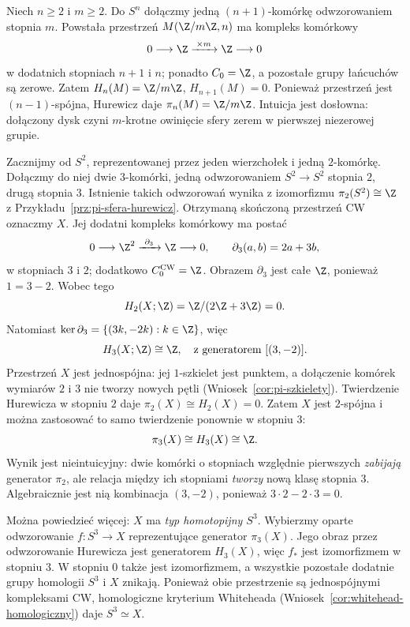 \begin{przyklad}
\label{prz:moore-hurewicz}
Niech $n\geq2$ i $m\geq2$.
Do $S^n$ dołączmy
jedną $(n+1)$-komórkę
odwzorowaniem stopnia $m$.
Powstała przestrzeń
$M(\Z/m\Z,n)$ ma
kompleks komórkowy
\[
 0\longrightarrow\Z
 \xrightarrow{\;\times m\;}\Z
 \longrightarrow0
\]
w dodatnich stopniach $n+1$ i $n$; ponadto $C_0=\Z$,
a pozostałe grupy łańcuchów są zerowe. Zatem
$H_n(M)=\Z/m\Z$,
$H_{n+1}(M)=0$.
Ponieważ przestrzeń
jest $(n-1)$-spójna,
Hurewicz daje
$\pi_n(M)=\Z/m\Z$.
Intuicja jest
dosłowna: dołączony
dysk czyni
$m$-krotne
owinięcie sfery
zerem w pierwszej
niezerowej grupie.
\end{przyklad}

\begin{przyklad}
\label{prz:pi-2-3-komorki}
Zacznijmy od $S^2$, reprezentowanej przez jeden wierzchołek
i jedną $2$-komórkę. Dołączmy do niej dwie $3$-komórki,
jedną odwzorowaniem $S^2\to S^2$ stopnia $2$,
drugą stopnia $3$. Istnienie takich odwzorowań wynika
z izomorfizmu $\pi_2(S^2)\cong\Z$
z Przykładu~\ref{prz:pi-sfera-hurewicz}.
Otrzymaną skończoną przestrzeń CW oznaczmy $X$.
Jej dodatni kompleks komórkowy ma postać
\[
 0\longrightarrow\Z^2
 \xrightarrow{\ \partial_3\ }\Z
 \longrightarrow0,\qquad
 \partial_3(a,b)=2a+3b,
\]
w stopniach $3$ i $2$; dodatkowo $C_0^{\mathrm{CW}}=\Z$.
Obrazem $\partial_3$ jest całe $\Z$,
ponieważ $1=3-2$. Wobec tego
\[
 H_2(X;\Z)=\Z/(2\Z+3\Z)=0.
\]
Natomiast
$\ker\partial_3=\{(3k,-2k):k\in\Z\}$,
więc
\[
 H_3(X;\Z)\cong\Z,
 \quad\text{z generatorem }[(3,-2)].
\]
Przestrzeń $X$ jest jednospójna: jej $1$-szkielet
jest punktem, a dołączenie komórek wymiarów $2$
i $3$ nie tworzy nowych pętli
(Wniosek~\ref{cor:pi-szkielety}).
Twierdzenie Hurewicza w stopniu $2$ daje
$\pi_2(X)\cong H_2(X)=0$.
Zatem $X$ jest $2$-spójna i można zastosować
to samo twierdzenie ponownie w stopniu $3$:
\[
 \pi_3(X)\cong H_3(X)\cong\Z.
\]
Wynik jest nieintuicyjny: dwie komórki o stopniach
względnie pierwszych \emph{zabijają} generator $\pi_2$,
ale relacja między ich stopniami \emph{tworzy}
nową klasę stopnia $3$. Algebraicznie jest nią
kombinacja $(3,-2)$, ponieważ $3\cdot2-2\cdot3=0$.

Można powiedzieć więcej: $X$ ma \emph{typ homotopijny $S^3$}.
Wybierzmy oparte odwzorowanie $f:S^3\to X$ reprezentujące
generator $\pi_3(X)$. Jego obraz przez odwzorowanie Hurewicza
jest generatorem $H_3(X)$, więc $f_*$ jest izomorfizmem
w stopniu $3$. W stopniu $0$ także jest izomorfizmem,
a wszystkie pozostałe dodatnie grupy homologii
$S^3$ i $X$ znikają. Ponieważ obie przestrzenie są
jednospójnymi kompleksami CW, homologiczne kryterium
Whiteheada (Wniosek~\ref{cor:whitehead-homologiczny})
daje $S^3\simeq X$.
\end{przyklad}

